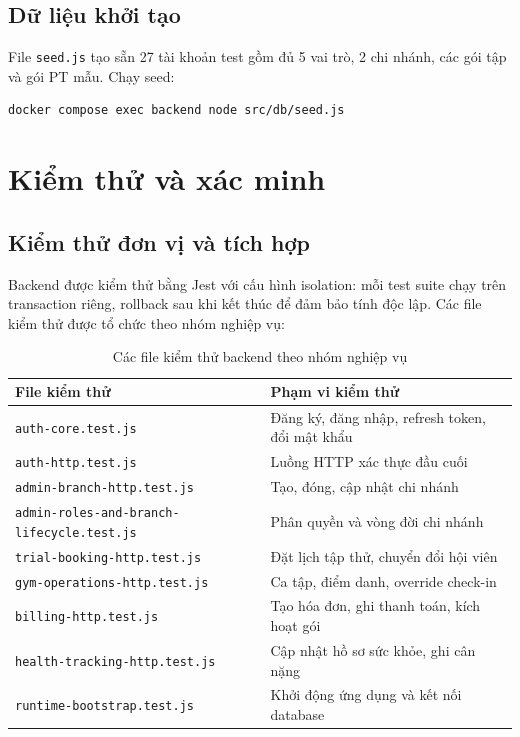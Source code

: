 \subsection{Dữ liệu khởi tạo}
File \texttt{seed.js} tạo sẵn 27 tài khoản test gồm đủ 5 vai trò, 2 chi nhánh, các gói tập và gói PT mẫu. Chạy seed:
\begin{verbatim}
docker compose exec backend node src/db/seed.js
\end{verbatim}

\section{Kiểm thử và xác minh}
\subsection{Kiểm thử đơn vị và tích hợp}
Backend được kiểm thử bằng Jest với cấu hình isolation: mỗi test suite chạy trên transaction riêng, rollback sau khi kết thúc để đảm bảo tính độc lập. Các file kiểm thử được tổ chức theo nhóm nghiệp vụ:

\begin{table}[H]
\centering
\begin{tabular}{|l|l|}
\hline
\textbf{File kiểm thử} & \textbf{Phạm vi kiểm thử} \\ \hline
\texttt{auth-core.test.js}          & Đăng ký, đăng nhập, refresh token, đổi mật khẩu \\
\texttt{auth-http.test.js}          & Luồng HTTP xác thực đầu cuối \\
\texttt{admin-branch-http.test.js}  & Tạo, đóng, cập nhật chi nhánh \\
\texttt{admin-roles-and-branch-lifecycle.test.js} & Phân quyền và vòng đời chi nhánh \\
\texttt{trial-booking-http.test.js} & Đặt lịch tập thử, chuyển đổi hội viên \\
\texttt{gym-operations-http.test.js} & Ca tập, điểm danh, override check-in \\
\texttt{billing-http.test.js}       & Tạo hóa đơn, ghi thanh toán, kích hoạt gói \\
\texttt{health-tracking-http.test.js} & Cập nhật hồ sơ sức khỏe, ghi cân nặng \\
\texttt{runtime-bootstrap.test.js}  & Khởi động ứng dụng và kết nối database \\ \hline
\end{tabular}
\caption{Các file kiểm thử backend theo nhóm nghiệp vụ}
\end{table}

